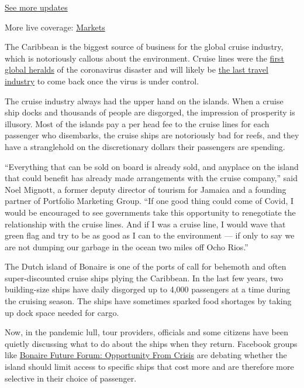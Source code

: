 \href{https://www.nytimes.com/2020/08/04/world/coronavirus-cases.html?action=click\&pgtype=Article\&state=default\&region=MAIN_CONTENT_1\&context=storylines_live_updates}{See
more updates}

More live coverage:
\href{https://www.nytimes.com/live/2020/08/04/business/stock-market-today-coronavirus?action=click\&pgtype=Article\&state=default\&region=MAIN_CONTENT_1\&context=storylines_live_updates}{Markets}

The Caribbean is the biggest source of business for the global cruise
industry, which is notoriously callous about the environment. Cruise
lines were the
\href{https://www.nytimes.com/2020/03/19/travel/coronavirus-cruise-costa-luminosa.html}{first
global heralds} of the coronavirus disaster and will likely be
\href{https://www.nytimes.com/2020/06/26/travel/coronavirus-cruises-reopening.html}{the
last travel industry} to come back once the virus is under control.

The cruise industry always had the upper hand on the islands. When a
cruise ship docks and thousands of people are disgorged, the impression
of prosperity is illusory. Most of the islands pay a per head fee to the
cruise lines for each passenger who disembarks, the cruise ships are
notoriously bad for reefs, and they have a stranglehold on the
discretionary dollars their passengers are spending.

``Everything that can be sold on board is already sold, and anyplace on
the island that could benefit has already made arrangements with the
cruise company,'' said Noel Mignott, a former deputy director of tourism
for Jamaica and a founding partner of Portfolio Marketing Group. ``If
one good thing could come of Covid, I would be encouraged to see
governments take this opportunity to renegotiate the relationship with
the cruise lines. And if I was a cruise line, I would wave that green
flag and try to be as good as I can to the environment --- if only to
say we are not dumping our garbage in the ocean two miles off Ocho
Rios.''

The Dutch island of Bonaire is one of the ports of call for behemoth and
often super-discounted cruise ships plying the Caribbean. In the last
few years, two building-size ships have daily disgorged up to 4,000
passengers at a time during the cruising season. The ships have
sometimes sparked food shortages by taking up dock space needed for
cargo.

Now, in the pandemic lull, tour providers, officials and some citizens
have been quietly discussing what to do about the ships when they
return. Facebook groups like
\href{https://www.facebook.com/groups/BonaireFutureForum/}{Bonaire
Future Forum: Opportunity From Crisis} are debating whether the island
should limit access to specific ships that cost more and are therefore
more selective in their choice of passenger.

